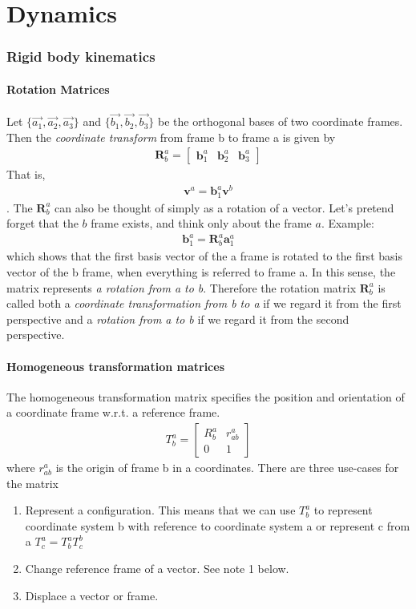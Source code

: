 \part{Dynamics}
\section{Rigid body kinematics}
\subsection{Rotation Matrices}
Let $\{\Vec{a_1},\Vec{a_2},\Vec{a_3}\}$ and $\{\Vec{b_1},\Vec{b_2},\Vec{b_3}\}$ be the orthogonal bases of two coordinate frames. Then the \textit{coordinate transform} from frame b to frame a is given by
\begin{align}
    \mathbf{R}_b^a = 
    \begin{bmatrix}
    \mathbf{b}_1^a & \mathbf{b}_2^a & \mathbf{b}_3^a
    \end{bmatrix}
\end{align}
That is,
\begin{align}
    \mathbf{v}^a = \mathbf{b}_1^a\mathbf{v}^b
\end{align}.
The $\mathbf{R}_b^a$ can also be thought of simply as a rotation of a vector. Let's pretend forget that the $b$ frame exists, and think only about the frame $a$. Example:
\begin{align}
    \mathbf{b}_1^a=\mathbf{R}_b^a\mathbf{a}_1^a
\end{align}
which shows that the first basis vector of the a frame is rotated to the first basis vector of the b frame, when everything is referred to frame a. In this sense, the matrix represents \textit{a rotation from a to b}. Therefore the rotation matrix $\mathbf{R}_b^a$ is called both a \textit{coordinate transformation from b to a} if we regard it from the first perspective and a \textit{rotation from a to b} if we regard it from the second perspective.

\subsection{Homogeneous transformation matrices}
The homogeneous transformation matrix specifies the position and orientation of a coordinate frame w.r.t. a reference frame. 
\begin{align}
    T_b^a = 
    \begin{bmatrix}
    R_b^a & r_{ab}^a \\
    0 & 1
    \end{bmatrix}
\end{align}
where $r_{ab}^a$ is the origin of frame b in a coordinates. There are three use-cases for the matrix
\begin{enumerate}
    \item Represent a configuration. This means that we can use $T_b^a$ to represent coordinate system b with reference to coordinate system a or represent c from a $T_c^a=T_b^a T_c^b$
    \item Change reference frame of a vector. See note 1 below.
    \item Displace a vector or frame.
\end{enumerate}

